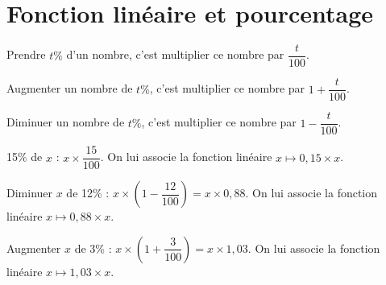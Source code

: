 \section{Fonction linéaire et pourcentage}
\begin{propriete}[\admise]
    Prendre $t\%$ d'un nombre, c'est multiplier ce nombre par $\dfrac{t}{100}$.

    Augmenter un nombre de $t\%$, c'est multiplier ce nombre par $1+\dfrac{t}{100}$.

    Diminuer un nombre de $t\%$, c'est multiplier ce nombre par $1-\dfrac{t}{100}$.
\end{propriete}
\begin{exemple*1}
    15\% de $x$ : $x\times\dfrac{15}{100}$. On lui associe la fonction linéaire $x\mapsto0,15\times x$.

    Diminuer $x$ de 12\% : $x\times\left(1-\dfrac{12}{100}\right)=x\times0,88$. On lui associe la fonction linéaire $x\mapsto0,88\times x$.

    Augmenter $x$ de 3\% : $x\times\left(1+\dfrac3{100}\right)=x\times1,03$. On lui associe la fonction linéaire $x\mapsto1,03\times x$.
\end{exemple*1}
